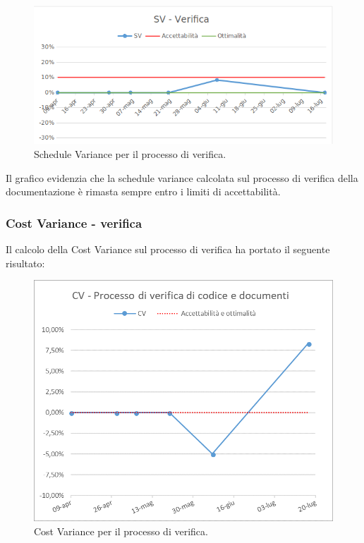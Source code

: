 \begin{figure}[h!]
	\centering
	\includegraphics[scale=0.75]{img/Grafici/SV-Verifica.png}
	\caption{Schedule Variance per il processo di verifica.}
	\label{fig:SV-VerDocumenti}
\end{figure}

Il grafico evidenzia che la schedule variance calcolata sul processo di verifica della documentazione è rimasta sempre entro i limiti di accettabilità.


\subsubsection{Cost Variance - verifica}
Il calcolo della Cost Variance sul processo di verifica ha portato il seguente risultato: 

\begin{figure}[h!]
	\centering
	\includegraphics[scale=0.75]{img/Grafici/CV-verifica.png}
	\caption{Cost Variance per il processo di verifica.}
	\label{fig:CV-VerDocumenti}
\end{figure}

